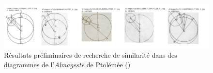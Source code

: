\begin{figure}[h]
	\centering
	\includegraphics[width=16cm]{images/eida_similarity.png}
	\caption{Résultats préliminaires de recherche de similarité dans des diagrammes de l'\textit{Almageste} de Ptolémée (\eida)}
	\label{fig:eida_similarity}
\end{figure}
